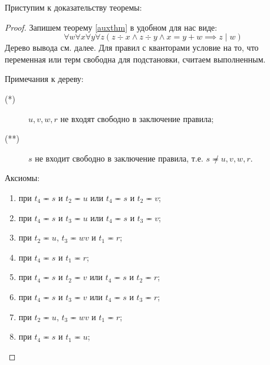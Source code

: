 \documentclass[10pt, a4paper, oneside]{memoir}
\begin{document}
Приступим к доказательству теоремы:
\begin{proof}
    Запишем теорему \ref{auxthm} в удобном для нас виде:
    \begin{equation}
        \forall w \forall x \forall y \forall z (z \div x \land z \div y \land x = y + w \implies z \mid w)
    \end{equation}
    Дерево вывода см. далее.
    Для правил с кванторами условие на то, что переменная или терм свободна для подстановки, считаем выполненным.

    Примечания к дереву:
    \begin{description}
        \item[(*)] $u, v, w, r$ не входят свободно в заключение правила;
        \item[(**)] $s$ не входит свободно в заключение правила, т.е. $s \not\eqcirc u, v, w, r$.
    \end{description}

    Аксиомы:
    \begin{enumerate}
        \item при $t_4 \eqcirc s$ и $t_2 \eqcirc u$ или $t_4 \eqcirc s$ и $t_2 \eqcirc v$;
        \item при $t_4 \eqcirc s$ и $t_3 \eqcirc u$ или $t_4 \eqcirc s$ и $t_3 \eqcirc v$;
        \item при $t_2 \eqcirc u$, $t_3 \eqcirc wv$ и $t_1 \eqcirc r$;
        \item при $t_4 \eqcirc s$ и $t_1 \eqcirc r$;
        \item при $t_4 \eqcirc s$ и $t_2 \eqcirc v$ или $t_4 \eqcirc s$ и $t_2 \eqcirc r$;
        \item при $t_4 \eqcirc s$ и $t_3 \eqcirc v$ или $t_4 \eqcirc s$ и $t_3 \eqcirc r$;
        \item при $t_2 \eqcirc u$, $t_3 \eqcirc wv$ и $t_1 \eqcirc r$;
        \item при $t_4 \eqcirc s$ и $t_1 \eqcirc u$;
    \end{enumerate}
\end{proof}
\end{document}
